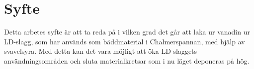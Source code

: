 
\section{Syfte}

Detta arbetes syfte är att ta reda på i vilken grad det går att laka ur vanadin ur LD-slagg, som har används som bäddmaterial i Chalmerspannan, med hjälp av svavelsyra. Med detta kan det vara möjligt att öka LD-slaggets användningsområden och sluta materialkretsar som i nu läget deponeras på hög. 